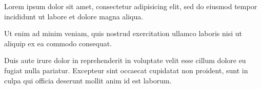 \documentclass{article}
\begin{document}
Lorem ipsum dolor sit amet, consectetur adipisicing elit, sed do eiusmod
tempor incididunt ut labore et dolore magna aliqua.

\begin{nodetreeenv}
Ut enim ad minim veniam, quis nostrud exercitation ullamco laboris nisi
ut aliquip ex ea commodo consequat.
\end{nodetreeenv}

Duis aute irure dolor in reprehenderit in voluptate velit esse cillum
dolore eu fugiat nulla pariatur. Excepteur sint occaecat cupidatat non
proident, sunt in culpa qui officia deserunt mollit anim id est laborum.
\end{document}
